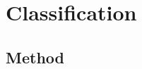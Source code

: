 \documentclass[11pt]{article}
\renewcommand{\P}[1]{\mathbb{P}\left[#1\right]}
\newcommand{\I}[1]{\mathbb{I}\left[#1\right]}
\begin{document}



\section{Classification}






\subsection{Method}
\end{document}
